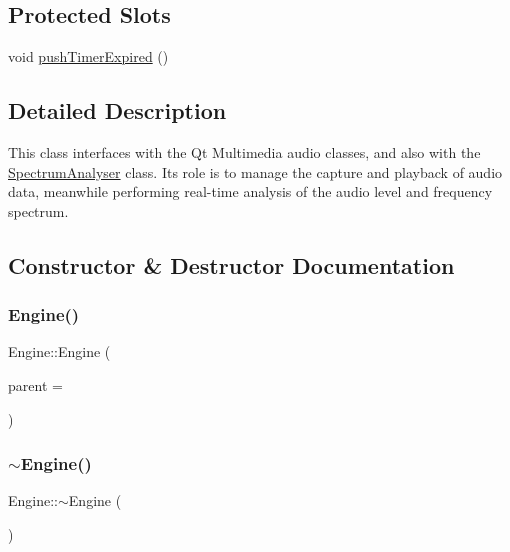 \subsection*{Protected Slots}
\begin{DoxyCompactItemize}
\item 
void \hyperlink{class_engine_a83047ff6af71dc546eeabccfde31d9aa}{push\+Timer\+Expired} ()
\end{DoxyCompactItemize}


\subsection{Detailed Description}
This class interfaces with the Qt Multimedia audio classes, and also with the \hyperlink{class_spectrum_analyser}{Spectrum\+Analyser} class. Its role is to manage the capture and playback of audio data, meanwhile performing real-\/time analysis of the audio level and frequency spectrum. 

\subsection{Constructor \& Destructor Documentation}
\hypertarget{class_engine_aa9a980fee0abf2524c4c449c0894c383}{}\label{class_engine_aa9a980fee0abf2524c4c449c0894c383} 
\subsubsection{\texorpdfstring{Engine()}{Engine()}}
{\footnotesize\ttfamily Engine\+::\+Engine (\begin{DoxyParamCaption}\item[{Q\+Object $\ast$}]{parent = {} }\end{DoxyParamCaption})\hspace{0.3cm}{\ttfamily [explicit]}}

\hypertarget{class_engine_a8ef7030a089ecb30bbfcb9e43094717a}{}\label{class_engine_a8ef7030a089ecb30bbfcb9e43094717a} 
\subsubsection{\texorpdfstring{$\sim$\+Engine()}{~Engine()}}
{\footnotesize\ttfamily Engine\+::$\sim$\+Engine (\begin{DoxyParamCaption}{ }\end{DoxyParamCaption})}



